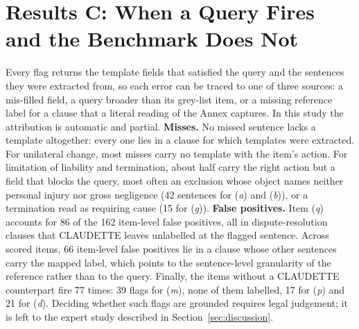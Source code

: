 \documentclass{IOS-Book-Article}
\newcommand{\corpus}{CLAUDETTE}
\newcommand{\gi}[1]{(\textit{#1})}
\begin{document}
\section{Results C: When a Query Fires and the Benchmark Does Not}
\label{sec:audit}
Every flag returns the template fields that satisfied the query and the sentences they were extracted from, so each error can be traced to one of three sources: a mis-filled field, a query broader than its grey-list item, or a missing reference label for a clause that a literal reading of the Annex captures. In this study the attribution is automatic and partial. \textbf{Misses.} No missed sentence lacks a template altogether: every one lies in a clause for which templates were extracted. For unilateral change, most misses carry no template with the item's action. For limitation of liability and termination, about half carry the right action but a field that blocks the query, most often an exclusion whose object names neither personal injury nor gross negligence (42 sentences for \gi{a} and \gi{b}), or a termination read as requiring cause (15 for \gi{g}). \textbf{False positives.} Item \gi{q} accounts for 86 of the 162 item-level false positives, all in dispute-resolution clauses that \corpus{} leaves unlabelled at the flagged sentence. Across scored items, 66 item-level false positives lie in a clause whose other sentences carry the mapped label, which points to the sentence-level granularity of the reference rather than to the query. Finally, the items without a \corpus{} counterpart fire 77 times: 39 flags for \gi{m}, none of them labelled, 17 for \gi{p} and 21 for \gi{d}. Deciding whether such flags are grounded requires legal judgement; it is left to the expert study described in Section~\ref{sec:discussion}.
\end{document}
